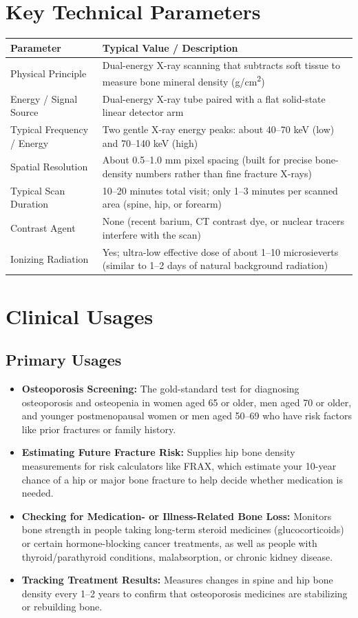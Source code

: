 \section{Key Technical Parameters}
\noindent
\begin{tabularx}{\textwidth}{@{}l X@{}}
\toprule
\textbf{Parameter} & \textbf{Typical Value / Description} \\
\midrule
Physical Principle & Dual-energy X-ray scanning that subtracts soft tissue to measure bone mineral density (g/cm\textsuperscript{2}) \\
Energy / Signal Source & Dual-energy X-ray tube paired with a flat solid-state linear detector arm \\
Typical Frequency / Energy & Two gentle X-ray energy peaks: about 40--70 keV (low) and 70--140 keV (high) \\
Spatial Resolution & About 0.5--1.0 mm pixel spacing (built for precise bone-density numbers rather than fine fracture X-rays) \\
Typical Scan Duration & 10--20 minutes total visit; only 1--3 minutes per scanned area (spine, hip, or forearm) \\
Contrast Agent & None (recent barium, CT contrast dye, or nuclear tracers interfere with the scan) \\
Ionizing Radiation & Yes; ultra-low effective dose of about 1--10 microsieverts (similar to 1--2 days of natural background radiation) \\
\bottomrule
\end{tabularx}

\section{Clinical Usages}

\subsection{Primary Usages}
\begin{itemize}
\item \textbf{Osteoporosis Screening:} The gold-standard test for diagnosing osteoporosis and osteopenia in women aged 65 or older, men aged 70 or older, and younger postmenopausal women or men aged 50--69 who have risk factors like prior fractures or family history.
\item \textbf{Estimating Future Fracture Risk:} Supplies hip bone density measurements for risk calculators like FRAX, which estimate your 10-year chance of a hip or major bone fracture to help decide whether medication is needed.
\item \textbf{Checking for Medication- or Illness-Related Bone Loss:} Monitors bone strength in people taking long-term steroid medicines (glucocorticoids) or certain hormone-blocking cancer treatments, as well as people with thyroid/parathyroid conditions, malabsorption, or chronic kidney disease.
\item \textbf{Tracking Treatment Results:} Measures changes in spine and hip bone density every 1--2 years to confirm that osteoporosis medicines are stabilizing or rebuilding bone.
\end{itemize}

